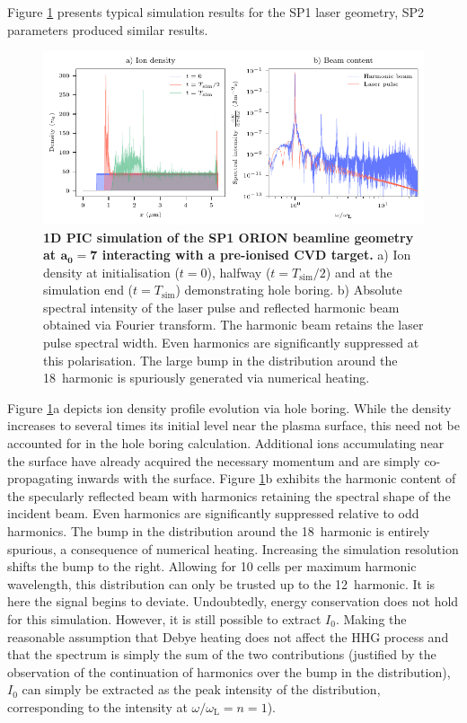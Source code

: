 Figure \ref{fig:orionsimfigs} presents typical simulation results for the SP1 laser geometry, SP2 parameters produced similar results.
\begin{figure}
	\centering
	\includegraphics{figures/orion/orion_sim_figs}
	\caption[Typical 1D HHG Smilei simulation results]{\textbf{1D PIC simulation of the SP1 ORION beamline geometry at $\mathbf{a_0 = 7}$ interacting with a pre-ionised CVD target.} a) Ion density at initialisation ($t=0$), halfway ($t=T_\mathrm{sim}/2$) and at the simulation end ($t=T_\mathrm{sim}$) demonstrating hole boring. b) Absolute spectral intensity of the laser pulse and reflected harmonic beam obtained via Fourier transform. The harmonic beam retains the laser pulse spectral width. Even harmonics are significantly suppressed at this polarisation. The large bump in the distribution around the 18\th\ harmonic is spuriously generated via numerical heating.}
	\label{fig:orionsimfigs}
\end{figure}
Figure \ref{fig:orionsimfigs}a depicts ion density profile evolution via hole boring. While the density increases to several times its initial level near the plasma surface, this need not be accounted for in the hole boring calculation. Additional ions accumulating near the surface have already acquired the necessary momentum and are simply co-propagating inwards with the surface. Figure \ref{fig:orionsimfigs}b exhibits the harmonic content of the specularly reflected beam with harmonics retaining the spectral shape of the incident beam. Even harmonics are significantly suppressed relative to odd harmonics. The bump in the distribution around the 18\th\ harmonic is entirely spurious, a consequence of numerical heating. Increasing the simulation resolution shifts the bump to the right. Allowing for 10 cells per maximum harmonic wavelength, this distribution can only be trusted up to the 12\th\ harmonic. It is here the signal begins to deviate. Undoubtedly, energy conservation does not hold for this simulation. However, it is still possible to extract $I_0$. Making the reasonable assumption that Debye heating does not affect the HHG process and that the spectrum is simply the sum of the two contributions (justified by the observation of the continuation of harmonics over the bump in the distribution), $I_0$ can simply be extracted as the peak intensity of the distribution, corresponding to the intensity at $\omega/\omega_\mathrm{L}=n = 1$).

